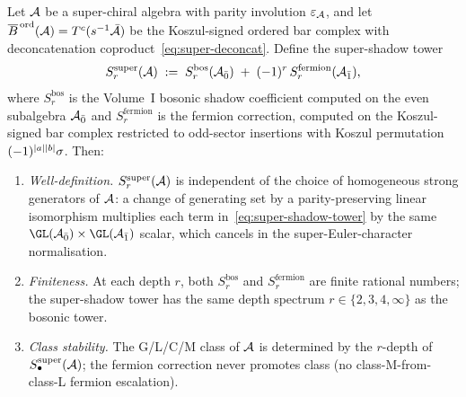 \begin{theorem}
\label{thm:super-shadow-well-defined}
Let $\mathcal{A}$ be a super-chiral algebra with parity involution
$\varepsilon_{\mathcal{A}}$, and let $\overline{B}^{\,\mathrm{ord}}(\mathcal{A}) = T^c(s^{-1}\bar{\mathcal{A}})$ be the
Koszul-signed ordered bar complex with deconcatenation
coproduct~\eqref{eq:super-deconcat}. Define the super-shadow tower
\begin{equation}
 \label{eq:super-shadow-tower}
 S_r^{\mathrm{super}}(\mathcal{A})
 \;:=\;
 S_r^{\mathrm{bos}}(\mathcal{A}_{\bar{0}})
 \;+\;
 (-1)^{r}\,
 S_r^{\mathrm{fermion}}(\mathcal{A}_{\bar{1}}),
\end{equation}
where $S_r^{\mathrm{bos}}$ is the Volume~I bosonic shadow coefficient
computed on the even subalgebra $\mathcal{A}_{\bar{0}}$ and
$S_r^{\mathrm{fermion}}$ is the fermion correction, computed on the
Koszul-signed bar complex restricted to odd-sector insertions with
Koszul permutation $(-1)^{|a||b|}\sigma$. Then:
\begin{enumerate}[label=\textup{(\roman*)}]
\item \emph{Well-definition.} $S_r^{\mathrm{super}}(\mathcal{A})$ is
 independent of the choice of homogeneous strong generators of $\mathcal{A}$:
 a change of generating set by a parity-preserving linear
 isomorphism multiplies each term in~\eqref{eq:super-shadow-tower}
 by the same $\GL(\cA_{\bar{0}})\times\GL(\cA_{\bar{1}})$ scalar,
 which cancels in the super-Euler-character normalisation.
\item \emph{Finiteness.} At each depth $r$, both
 $S_r^{\mathrm{bos}}$ and $S_r^{\mathrm{fermion}}$ are finite rational
 numbers; the super-shadow tower has the same depth spectrum
 $r\in\{2,3,4,\infty\}$ as the bosonic tower.
\item \emph{Class stability.} The G/L/C/M class of $\mathcal{A}$ is determined
 by the $r$-depth of $S_\bullet^{\mathrm{super}}(\mathcal{A})$; the fermion
 correction never promotes class (no class-M-from-class-L fermion
 escalation).
\end{enumerate}
\end{theorem}

